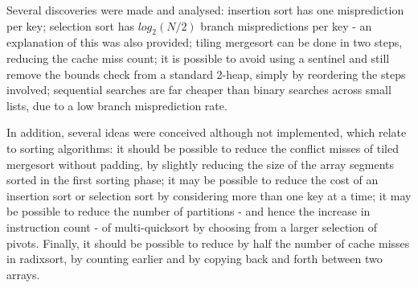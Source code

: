 
Several discoveries were made and analysed: insertion sort has one misprediction
per key; selection sort has $log_2(N/2)$ branch mispredictions per key - an
explanation of this was also provided; tiling mergesort can be done in two
steps, reducing the cache miss count; it is possible to avoid using a
sentinel and still remove the bounds check from a standard 2-heap, simply by
reordering the steps involved; sequential searches are far cheaper than binary
searches across small lists, due to a low branch misprediction rate.



In addition, several ideas were conceived although not implemented, which relate
to sorting algorithms: it should be possible to reduce the conflict misses of
tiled mergesort without padding, by slightly reducing the size of the array
segments sorted in the first sorting phase; it may be possible to reduce the
cost of an insertion sort or selection sort by considering more than one key at
a time; it may be possible to reduce the number of partitions - and hence the
increase in instruction count - of multi-quicksort by choosing from a larger
selection of pivots. Finally, it should be possible to reduce by half the number
of cache misses in radixsort, by counting earlier and by copying back and forth
between two arrays.
